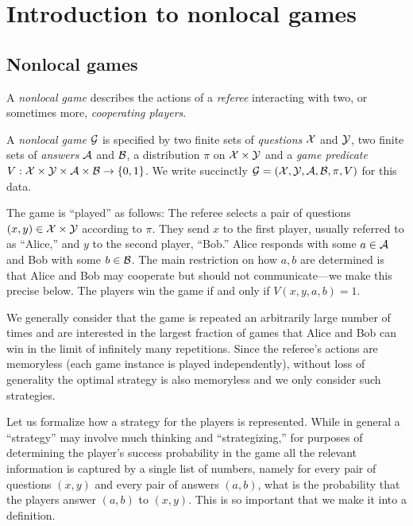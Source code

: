 
\chapter{Introduction to nonlocal games}

\section{Nonlocal games}

A \emph{nonlocal game} describes the actions of a \emph{referee} interacting with two, or sometimes more, \emph{cooperating players}. 

\begin{definition}
A \emph{nonlocal game} $\mathcal{G}$ is specified by two finite sets of \emph{questions} $\mathcal{X}$ and $\mathcal{Y}$, two finite sets of \emph{answers} $\mathcal{A}$ and $\mathcal{B}$, a distribution $\pi$ on $\mathcal{X}\times \mathcal{Y}$ and a \emph{game predicate} $V: \mathcal{X}\times \mathcal{Y} \times \mathcal{A}\times \mathcal{B} \to \{0,1\}$. We write succinctly $\mathcal{G}=(\mathcal{X},\mathcal{Y},\mathcal{A},\mathcal{B},\pi,V)$ for this data. 
\end{definition}

The game is ``played'' as follows: The referee selects a pair of questions $(x,y)\in\mathcal{X}\times \mathcal{Y}$ according to $\pi$. They send $x$ to the first player, usually referred to as ``Alice,'' and $y$ to the second player, ``Bob.'' Alice responds with some $a\in \mathcal{A}$ and Bob with some $b\in \mathcal{B}$. The main restriction on how $a,b$ are determined is that Alice and Bob may cooperate but should not communicate---we make this precise below. The players win the game if and only if $V(x,y,a,b)=1$. 

We generally consider that the game is repeated an arbitrarily large number of times and are interested in the largest fraction of games that Alice and Bob can win in the limit of infinitely many repetitions. Since the referee's actions are memoryless (each game instance is played independently), without loss of generality the optimal strategy is also memoryless and we only consider such strategies.

Let us formalize how a strategy for the players is represented. While in general a ``strategy'' may involve much thinking and ``strategizing,'' for purposes of determining the player's success probability in the game all the relevant information is captured by a single list of numbers, namely for every pair of questions $(x,y)$ and every pair of answers $(a,b)$, what is the probability that the players answer $(a,b)$ to $(x,y)$. This is so important that we make it into a definition.

